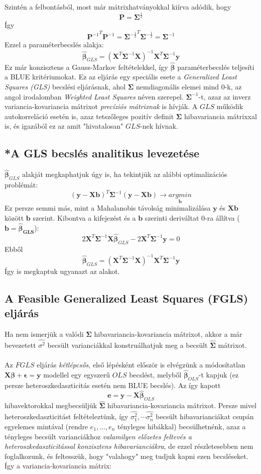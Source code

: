 \documentclass[14p]{report}
\def\pmb{\boldsymbol}
\def\ebeta{\hat{\pmb{\beta}}}
\def\e{\epsilon}
\newcounter{x}
\newcounter{y}
\newcounter{z}
\begin{document}
	Szintén a felbontásból, most már mátrixhatványokkal kiírva adódik, hogy
	\[
		\pmb{P} = \pmb{\Sigma}^{\frac{1}{2}}
	\]
	Így
	\[
		{\pmb{P}^{-1}}^T\pmb{P}^{-1} = {\pmb{\Sigma}^{-\frac{1}{2}}}^T\pmb{\Sigma}^{-\frac{1}{2}} = \pmb{\Sigma}^{-1}
	\]
	Ezzel a paraméterbecslés alakja:
	\[
		\ebeta_{GLS} = (\pmb{X}^T\pmb{\Sigma}^{-1}\pmb{X})^{-1}\pmb{X}^T\pmb{\Sigma}^{-1}\pmb{y}
	\]
	Ez már konzisztens a Gauss-Markov feltételekkel, így $\ebeta$ paraméterbecslés teljesíti a BLUE kritériumokat. Ez az eljárás egy speciális esete a \emph{Generalized Least Squares (GLS)} becslési eljárásnak, ahol $\pmb{\Sigma}$ nemdiagonális elemei mind $0$-k, az angol irodalomban \emph{Weighted Least Squares} néven szerepel. $\pmb{\Sigma}^{-1}$-t, azaz az inverz variancia-kovariancia mátrixot \emph{precíziós mátrixnak} is hívják. A $GLS$ működik autokorreláció esetén is, azaz tetszőleges pozitív definit $\pmb{\Sigma}$ hibavariancia mátrixxal is, és igazából ez az amit "hivatalosan" $GLS$-nek hívnak.
	
	\subsection{*A GLS becslés analitikus levezetése}
	$\ebeta_{GLS}$ alakját megkaphatjuk úgy is, ha tekintjük az alábbi optimalizációs problémát:
	\[
		(\pmb{y} - \pmb{X}\pmb{b})^T\pmb{\Sigma}^{-1}(\pmb{y} - \pmb{X}\pmb{b}) \rightarrow \underset{\pmb{b}}{argmin}
	\]
	Ez persze semmi más, mint a Mahalanobis távolság minimalizálása $\pmb{y}$ és $\pmb{X}\pmb{b}$ között $\pmb{b}$ szerint. Kibontva a kifejezést és a $\pmb{b}$ szerinti deriváltat $0$-ra állítva ($\pmb{b} = \pmb{\ebeta_{GLS}}$):
	\[
		2\pmb{X}^T\pmb{\Sigma}^{-1}\pmb{X}\ebeta_{GLS} - 2\pmb{X}^T\pmb{\Sigma}^{-1}\pmb{y} = 0
	\]
	Ebből
	\[
		\ebeta_{GLS} = (\pmb{X}^T\pmb{\Sigma}^{-1}\pmb{X})^{-1}\pmb{X}^T\pmb{\Sigma}^{-1}\pmb{y}
	\]
	Így is megkaptuk ugyanazt az alakot.
	\subsection{A Feasible Generalized Least Squares (FGLS) eljárás}
	Ha nem ismerjük a valódi $\pmb{\Sigma}$ hibavariancia-kovariancia mátrixot, akkor a már bevezetett $\widehat{\sigma^2}$ becsült varianciákkal konstruálhatjuk meg a becsült $\widehat{\pmb{\Sigma}}$ mátrixot.
	\\
	\\
	Az $FGLS$ eljárás \emph{kétlépcsős}, első lépésként először is elvégzünk a módosítatlan $\pmb{X}\pmb{\beta} + \pmb{\e} = \pmb{y}$ modellel egy egyszerű $OLS$ becslést, melyből $\ebeta_{OLS}$-t kapjuk (ez persze heteroszkedaszticitás esetén nem BLUE becslés). Az így kapott
	\[
		\pmb{e} = \pmb{y} - \pmb{X}\ebeta_{OLS}
	\]
	hibavektorokkal megbecsüljük $\widehat{\pmb{\Sigma}}$ hibavariancia-kovariancia mátrixot. Persze mivel heteroszkedaszticitást feltételeztünk, így $\widehat{\sigma_1^2}, \dotsm \widehat{\sigma_n^2}$ becsült hibavarianciákat csupán egyelemes mintával (rendre $e_1, \dots, e_n$ tényleges hibákkal) becsülhetnénk, azaz a tényleges becsült varianciákhoz \emph{valamilyen előzetes feltevés a heteroszkedaszticitással konzisztens hibavarianciákra}, de ezzel részletesebben nem foglalkozunk, és feltesszük, hogy "valahogy" meg tudjuk kapni ezen becsléseket. Így a variancia-kovariancia mátrix:  
\end{document}

